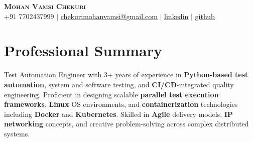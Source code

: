 \documentclass[letterpaper,11pt]{article}
\begin{document}
\begin{center}
    \textbf{\Huge \scshape Mohan Vamsi Chekuri} \\ \vspace{1pt}
    \small +91 7702437999 $|$ \href{mailto:chekurimohanvamsi@gmail.com}{\underline{chekurimohanvamsi@gmail.com}} $|$
    \href{https://www.linkedin.com/in/mvamsi73}{\underline{linkedin}} $|$
    \href{https://github.com}{\underline{github}}
\end{center}

\section{Professional Summary}
Test Automation Engineer with 3+ years of experience in \textbf{Python-based test automation}, system and software testing, and \textbf{CI/CD}-integrated quality engineering. Proficient in designing scalable \textbf{parallel test execution frameworks}, \textbf{Linux} OS environments, and \textbf{containerization} technologies including \textbf{Docker} and \textbf{Kubernetes}. Skilled in \textbf{Agile} delivery models, \textbf{IP networking} concepts, and creative problem-solving across complex distributed systems.
\end{document}
